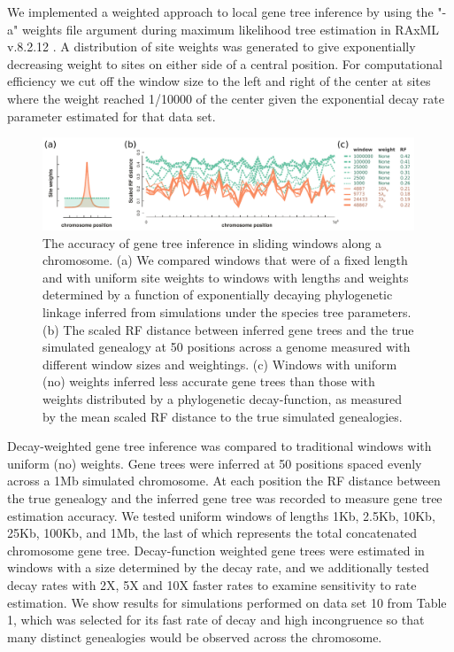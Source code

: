 \documentclass[11pt]{article}
\begin{document}

We implemented a weighted approach to local gene tree inference by using the "-a" weights file argument during maximum likelihood tree estimation in RAxML v.8.2.12 \citep{stamatakis_raxml_2014}. A distribution of site weights was generated to give exponentially decreasing weight to sites on either side of a central position. For computational efficiency we cut off the window size to the left and right of the center at sites where the weight reached 1/10000 of the center given the exponential decay rate parameter estimated for that data set.


\begin{figure}
	\centering
		\includegraphics[width=0.99\textwidth]{./figures/Fig-3-post-revision}
		\caption{
			The accuracy of gene tree inference in sliding windows along a 
			chromosome. (a) We compared windows that were of a fixed length and 
			with uniform site weights to windows with lengths and weights 
			determined by a function of exponentially decaying phylogenetic 
			linkage inferred from simulations under the species tree parameters. 
			(b) The scaled RF distance between inferred gene trees and the 
			true simulated genealogy at 50 positions across a genome measured 
			with different window sizes and weightings.
			(c) Windows with uniform (no) weights inferred less accurate gene
			trees than those with weights distributed by a phylogenetic 
			decay-function, as measured by the mean scaled RF distance to the 
			true simulated genealogies.
		}
\end{figure}

Decay-weighted gene tree inference was compared to traditional windows with uniform (no) weights. Gene trees were inferred at 50 positions spaced evenly across a 1Mb simulated chromosome. At each position the RF distance between the true genealogy and the inferred gene tree was recorded to measure gene tree estimation accuracy. We tested uniform windows of lengths 1Kb, 2.5Kb, 10Kb, 25Kb, 100Kb, and 1Mb, the last of which represents the total concatenated chromosome gene tree. Decay-function weighted gene trees were estimated in windows with a size determined by the decay rate, and we additionally tested decay rates with 2X, 5X and 10X faster rates to examine sensitivity to rate estimation. We show results for simulations performed on data set 10 from Table 1, which was selected for its fast rate of decay and high incongruence so that many distinct genealogies would be observed across the chromosome.
\end{document}
